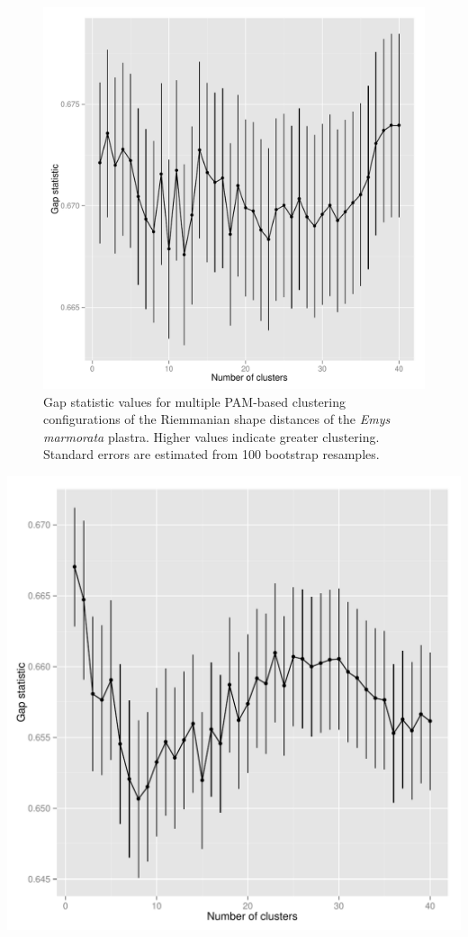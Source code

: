 \documentclass{article}\usepackage{graphicx, color}
\makeatletter
\def\maxwidth{ %
  \ifdim\Gin@nat@width>\linewidth
    \linewidth
  \else
    \Gin@nat@width
  \fi
}
\newenvironment{knitrout}{}{} %
\makeatother
\begin{document}
\begin{figure}[ht]
  \centering
  \includegraphics[width = \textwidth, keepaspectratio = true]{figure/gap}
  \caption{Gap statistic values for multiple PAM-based clustering configurations of the Riemmanian shape distances of the \textit{Emys marmorata} plastra. Higher values indicate greater clustering. Standard errors are estimated from 100 bootstrap resamples.}
  \label{fig:gap}
\end{figure}

\begin{knitrout}
\color{fgcolor}
\includegraphics[width=\maxwidth]{figure/a-gap} 

\end{knitrout}
\end{document}
